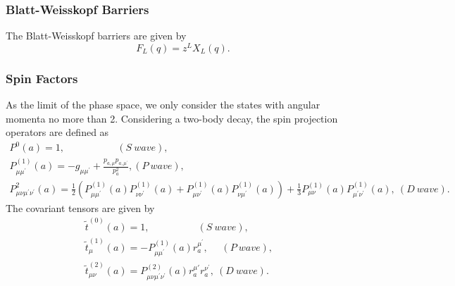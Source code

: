 {    \subsubsection{Blatt-Weisskopf Barriers}{
        The Blatt-Weisskopf barriers are given by 
        \begin{equation}
            F_{L}(q) = z^{L}X_{L}(q). 
            \label{Blatt-Weisskopf barrier} 
        \end{equation}
    }

    \subsubsection{Spin Factors}
    \par{
        As the limit of the phase space, we only consider the states with angular momenta no more than 2. 
        Considering a two-body decay, the spin projection operators are defined as  
        \begin{equation}
            \begin{array}{lr}
                P^{0}(a) = 1,   \ \ \ \ \ \  \ \ \ \ \ \  \ \ \ \ \ \ \ \ \ \ \ \        (S\ wave), &\\
                P^{(1)}_{\mu\mu^{'}}(a) = -g_{\mu\mu^{'}}+\frac{p_{a,\mu}p_{a,\mu^{'}}}{p_{a}^{2}},          (P\ wave), &\\
                P^{2}_{\mu\nu\mu^{'}\nu^{'}}(a) = \frac{1}{2}(P^{(1)}_{\mu\mu^{'}}(a)P^{(1)}_{\nu\nu^{'}}(a)+P^{(1)}_{\mu\nu^{'}}(a)P^{(1)}_{\nu\mu^{'}}(a))+\frac{1}{3}P^{(1)}_{\mu\nu}(a)P^{(1)}_{\mu^{'}\nu^{'}}(a),\           (D\ wave). &
            \end{array}\label{spin-projection-operators} 
        \end{equation}
       The covariant tensors are given by 
        \begin{equation}
            \begin{array}{lr}
                \tilde{t}^{(0)}(a) = 1, \ \ \ \ \ \  \ \ \ \ \ \   \ \ \ \ \ \ \ \ \ \       (S\ wave), &\\
                \tilde{t}^{(1)}_{\mu}(a) = -P^{(1)}_{\mu\mu^{'}}(a)r^{\mu^{'}}_{a},   \ \  \ \ \ \         (P\ wave), &\\
                \tilde{t}^{(2)}_{\mu\nu}(a) = P^{(2)}_{\mu\nu\mu^{'}\nu^{'}}(a)r^{\mu{'}}_{a}r^{\nu^{'}}_{a}, \           (D\ wave). &\\
            \end{array}\label{covariant-tensors} 
        \end{equation}
}}
